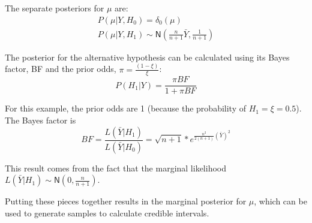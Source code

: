 \documentclass[AMA,STIX1COL]{WileyNJD-v2}\usepackage[]{graphicx}\usepackage[]{color}
\begin{document}
The separate posteriors for $\mu$ are:
\begin{gather}
P(\mu|Y, H_0) = \delta_0(\mu)\\
P(\mu|Y, H_1) \sim \textsf{N}(\frac{n}{n+1}\bar Y, \frac{1}{n+1})
\end{gather}

The posterior for the alternative hypothesis can be calculated using its Bayes factor, BF and the prior odds, $\pi = \frac{(1-\xi)}{\xi}$: 
\begin{equation}
P(H_1| Y ) = \frac{\pi BF}{1+\pi BF}
\end{equation}

For this example, the prior odds are 1 (because the probability of $H_1 = \xi = 0.5$). The Bayes factor is
\begin{equation}
BF = \frac{L(\bar Y | H_1)}{L(\bar Y | H_0)} = \sqrt{n+1}* e^{\frac{n^2}{2(n+1)}(\bar Y)^2}
\end{equation}

This result comes from the fact that the marginal likelihood $L(\bar Y | H_1) \sim \textsf{N}(0, \frac{n}{n+1})$.


Putting these pieces together results in the marginal posterior for $\mu$, which can be used to generate samples to calculate credible intervals. 
\end{document}
